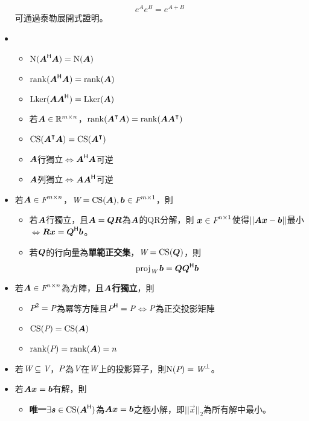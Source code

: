 \begin{itemize}
\begin{equation}
		e^{A}e^{B} = e^{A + B}
    \end{equation} 可通過泰勒展開式證明。
    \item \begin{itemize}
		\item $\Ker(\mat{A}\herm \mat{A}) = \Ker(\mat{A})$
		\item $\rnk(\mat{A}\herm \mat{A}) = \rnk(\mat{A})$
		\item $\lker(\mat{A} \mat{A}\herm) = \lker(\mat{A})$
		\item 若$\mat{A} \in \R^{m \times n}$，$\rnk(\mat{A}^\intercal \mat{A}) = \rnk(\mat{A}\mat{A}^\intercal)$
		\item $\cs(\mat{A}^\intercal\mat{A}) = \cs(\mat{A}^\intercal)$
		\item $\mat{A}$行獨立$\iff$$\mat{A}\herm\mat{A}$可逆
		\item $\mat{A}$列獨立$\iff$$\mat{A}\mat{A}\herm$可逆
    \end{itemize}
    \item 若$\mat{A} \in \F^{m \times n}$，$\spc{W} = \cs(\mat{A}), \vec{b} \in \F^{m \times 1}$，則
	\begin{itemize}
		\item 若$\mat{A}$行獨立，且$\mat{A} = \mat{QR}$為$\mat{A}$的QR分解，則
		$\vec{x} \in \F^{n \times 1}$使得$||\mat{A}\vec{x} - \vec{b}||$最小$\iff$$\mat{R}\vec{x} = \mat{Q}\herm \vec{b}$。
		\item 若$\mat{Q}$的行向量為\textbf{單範正交集}，$\spc{W} = \cs(\mat{Q})$，則
		\begin{equation}
			\proj{\spc{W}}{b} = \mat{Q}\mat{Q}\herm\vec{b}
		\end{equation}
    \end{itemize}
    \item 若$\mat{A} \in \F^{n \times n}$為方陣，且$\mat{A}$\textbf{行獨立}，則
	\begin{itemize}
		\item $\P^2 = \P$為冪等方陣且$\P\herm = \P$$\iff$$\P$為正交投影矩陣
		\item $\cs(\P) = \cs(\mat{A})$
		\item $\rnk(\P) = \rnk(\mat{A}) = n$
    \end{itemize}
    \item 若$\spc{W} \subseteq \V$，$\P$為$\V$在$\spc{W}$上的投影算子，則$\Ker(\P) = \spc{W}^{\perp}$。
    \item 若$\mat{A}\vec{x} = \vec{b}$有解，則
	\begin{itemize}
		\item \textbf{唯一}$\exists \vec{s} \in \cs(\mat{A}\herm)$為$\mat{A}\vec{x} = \vec{b}$之極小解，即$||\vec{x}||_2$為所有解中最小。

\end{itemize}
\end{itemize}
